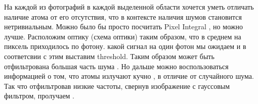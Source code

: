 На каждой из фотографий в каждой выделенной области хочется уметь отличать наличие атома от его отсутствия, что в контексте наличия шумов становится нетривиальным. Можно было бы просто посчитать Pixel Integral , но можно лучше. Расположим оптику (схема оптики) таким образом, что в среднем на пиксель приходилось по фотону.  какой сигнал на один фотон мы ожидаем и в соответсвии с этим выставим threshold. Таким образом может быть отфильтрована большая часть шума . Но дальше можно воспользоваться информацией о том, что атомы излучают кучно , в отличие от случайного шума. Так что отфильтровав низкие частоты, свернув изображение с гауссовым фильтром, пролучаем . 















